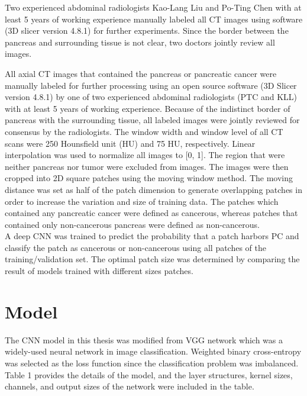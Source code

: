 Two experienced abdominal radiologists Kao-Lang Liu and Po-Ting Chen with at least 5 years of working experience manually labeled all CT images using software (3D slicer version 4.8.1) for further experiments. Since the border between the pancreas and surrounding tissue is not clear, two doctors jointly review all images.

All axial CT images that contained the pancreas or pancreatic cancer were manually labeled for further processing using an open source software (3D Slicer version 4.8.1) by one of two experienced abdominal radiologists (PTC and KLL) with at least 5 years of working experience. Because of the indistinct border of pancreas with the surrounding tissue, all labeled images were jointly reviewed for consensus by the radiologists.
 The window width and window level of all CT scans were 250 Hounsfield unit (HU) and 75 HU, respectively. Linear interpolation was used to normalize all images to [0, 1]. The region that were neither pancreas nor tumor were excluded from images. The images were then cropped into 2D square patches using the moving window method. The moving distance was set as half of the patch dimension to generate overlapping patches in order to increase the variation and size of training data. The patches which contained any pancreatic cancer were defined as cancerous, whereas patches that contained only non-cancerous pancreas were defined as non-cancerous.
 \\
A deep CNN was trained to predict the probability that a patch harbors PC and classify the patch as cancerous or non-cancerous using all patches of the training/validation set. The optimal patch size was determined by comparing the result of models trained with different sizes patches. \cite{liu2020deep}

\section{Model}
The CNN model in this thesis was modified from VGG network which was a widely-used neural network in image classification. Weighted binary cross-entropy was selected as the loss function since the classification problem was imbalanced. Table 1 provides the details of the model, and the layer structures, kernel sizes, channels, and output sizes of the network were included in the table. \cite{liu2020deep}

